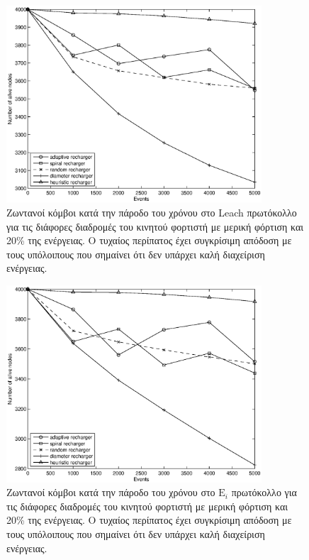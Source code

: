 \begin{figure}[H]
  \centering
  \includegraphics[width=0.85\textwidth]{experiments/4000nodes/4.ourVSnaive/alive_nodes_leach_rc_per_our-spiral-random-diameter-heuristic.eps}
  \caption{Ζωντανοί κόμβοι κατά την πάροδο του χρόνου στο Leach πρωτόκολλο για τις διάφορες διαδρομές του κινητού φορτιστή με μερική φόρτιση και 20\% της
ενέργειας. Ο τυχαίος περίπατος έχει συγκρίσιμη απόδοση με τους υπόλοιπους που σημαίνει ότι δεν υπάρχει καλή διαχείριση ενέργειας.}
  \label{fig:5_4exp_1_2}
\end{figure}

\begin{figure}[H]
  \centering
  \includegraphics[width=0.85\textwidth]{experiments/4000nodes/4.ourVSnaive/alive_nodes_ei_rc_per_our-spiral-random-diameter-heuristic.eps}
  \caption{Ζωντανοί κόμβοι κατά την πάροδο του χρόνου στο $\text{E}_{i}$ πρωτόκολλο για τις διάφορες διαδρομές του κινητού φορτιστή με μερική φόρτιση και 20\% της
ενέργειας. Ο τυχαίος περίπατος έχει συγκρίσιμη απόδοση με τους υπόλοιπους που σημαίνει ότι δεν υπάρχει καλή διαχείριση ενέργειας.}
  \label{fig:5_4exp_1_3}
\end{figure}



